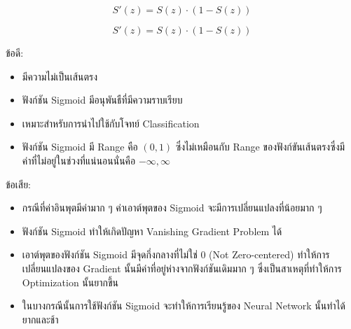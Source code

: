 \begin{itemize}
\begin{figure}[H]
\begin{subfigure}{0.5\textwidth}
            \caption{%
                \begin{equation}
                    S'(z) = S(z) \cdot (1 - S(z))
                \end{equation}
            }
            \label{fig:actfunc_sigmoid_der}
        \end{subfigure}
    \end{figure}

    ข้อดี:
    \begin{itemize}
        \item มีความไม่เป็นเส้นตรง
        
        \item ฟังก์ชัน Sigmoid มีอนุพันธืที่มีความราบเรียบ
        
        \item เหมาะสำหรับการนำไปใช้กับโจทย์ Classification
        
        \item ฟังก์ชัน Sigmoid มี Range คือ $(0,1)$ ซึ่งไม่เหมือนกับ Range ของฟังก์ขันเส้นตรงซึ่งมีค่าที่ไม่อยู่ในช่วงที่แน่นอนนั่นคือ 
        $-\infty, \infty$
    \end{itemize}
    ข้อเสีย:
    \begin{itemize}
        \item กรณีที่ค่าอินพุตมีค่ามาก ๆ ค่าเอาต์พุตของ Sigmoid จะมีการเปลี่ยนแปลงที่น้อยมาก ๆ
        
        \item ฟังก์ชัน Sigmoid ทำให้เกิดปัญหา Vanishing Gradient Problem ได้
        
        \item เอาต์พุตของฟังก์ชัน Sigmoid มีจุดกึ่งกลางที่ไม่ใช่ 0 (Not Zero-centered) ทำให้การเปลี่ยนแปลงของ Gradient 
        นั้นมีค่าที่อยู่ห่างจากฟังก์ชันเดิมมาก ๆ ซึ่งเป็นสาเหตุที่ทำให้การ Optimization นั้นยากขึ้น

        \item ในบางกรณีนั้นการใช้ฟังก์ชัน Sigmoid จะทำให้การเรียนรู้ของ Neural Network นั้นทำได้ยากและช้า
    \end{itemize}


\end{itemize}
